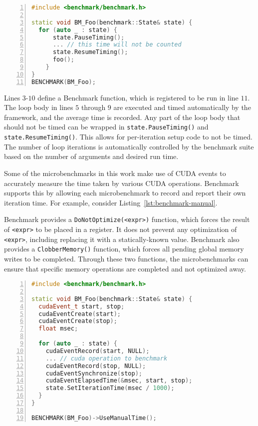 \begin{lstlisting}[language=C++, caption=Benchmark with automatic timing., label=lst:benchmark-automatic, numbers=left]
#include <benchmark/benchmark.h>

static void BM_Foo(benchmark::State& state) {
  for (auto _ : state) {
	  state.PauseTiming();
	  ... // this time will not be counted
	  state.ResumeTiming();
	  foo();
	}
}
BENCHMARK(BM_Foo);
\end{lstlisting}

Lines $3$-$10$ define a Benchmark function, which is registered to be run in line $11$.
The loop body in lines $5$ through $9$ are executed and timed automatically by the framework, and the average time is recorded.
Any part of the loop body that should not be timed can be wrapped in \texttt{state.PauseTiming()} and \texttt{state.ResumeTiming()}.
This allows for per-iteration setup code to not be timed.
The number of loop iterations is automatically controlled by the benchmark suite based on the number of arguments and desired run time.

Some of the microbenchmarks in this work make use of CUDA events to accurately measure the time taken by various CUDA operations.
Benchmark supports this by allowing each microbenchmark to record and report their own iteration time.
For example, consider Listing~\ref{lst:benchmark-manual}.

Benchmark provides a \texttt{DoNotOptimize(<expr>)} function, which forces the result of \texttt{<expr>} to be placed in a register.
It does not prevent any optimization of \texttt{<expr>}, including replacing it with a statically-known value.
Benchmark also provides a \texttt{ClobberMemory()} function, which forces all pending global memory writes to be completed.
Through these two functions, the microbenchmarks can ensure that specific memory operations are completed and not optimized away.

\begin{lstlisting}[language=C++, caption=Benchmark with manual timing., label=lst:benchmark-manual, numbers=left]
#include <benchmark/benchmark.h>

static void BM_Foo(benchmark::State& state) {
  cudaEvent_t start, stop;
  cudaEventCreate(start);
  cudaEventCreate(stop);
  float msec;

  for (auto _ : state) {
    cudaEventRecord(start, NULL);
    ... // cuda operation to benchmark
    cudaEventRecord(stop, NULL);
    cudaEventSynchronize(stop);
    cudaEventElapsedTime(&msec, start, stop);
    state.SetIterationTime(msec / 1000);
  }
}

BENCHMARK(BM_Foo)->UseManualTime();
\end{lstlisting}

